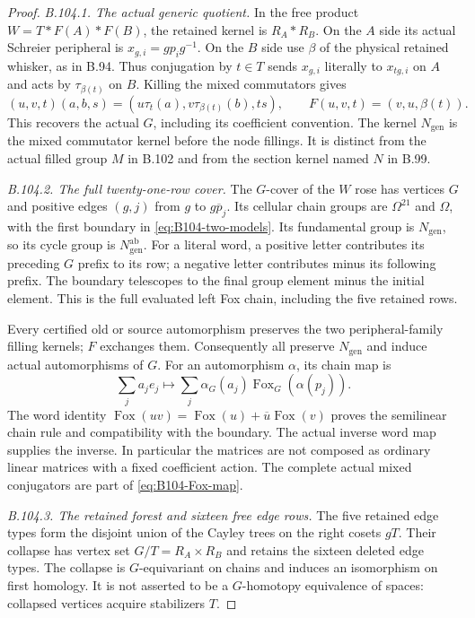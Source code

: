\begin{proof}
\emph{B.104.1. The actual generic quotient.}
In the free product $W=T*F(A)*F(B)$, the retained kernel is
$R_A*R_B$. On the $A$ side its actual Schreier peripheral is
$x_{g,i}=g p_i g^{-1}$. On the $B$ side use $\beta$ of the
physical retained whisker, as in B.94. Thus conjugation by $t\in T$
sends $x_{g,i}$ literally to $x_{tg,i}$ on $A$ and acts by
$\tau_{\beta(t)}$ on $B$. Killing the mixed commutators gives
\[
 (u,v,t)(a,b,s)=
       (u\tau_t(a),v\tau_{\beta(t)}(b),ts),
 \qquad F(u,v,t)=(v,u,\beta(t)).
\]
This recovers the actual $G$, including its coefficient convention.
The kernel $N_{\mathrm{gen}}$ is the mixed commutator kernel before
the node fillings. It is distinct from the actual filled group $M$
in B.102 and from the section kernel named $N$ in B.99.

\emph{B.104.2. The full twenty-one-row cover.}
The $G$-cover of the $W$ rose has vertices $G$ and positive edges
$(g,j)$ from $g$ to $g\overline p_j$. Its cellular chain groups are
$\Omega^{21}$ and $\Omega$, with the first boundary in
\eqref{eq:B104-two-models}. Its fundamental group is
$N_{\mathrm{gen}}$, so its cycle group is
$N_{\mathrm{gen}}^{\mathrm{ab}}$.
For a literal word, a positive letter contributes its preceding
$G$ prefix to its row; a negative letter contributes minus its
following prefix. The boundary telescopes to the final group
element minus the initial element. This is the full evaluated
left Fox chain, including the five retained rows.

Every certified old or source automorphism preserves the two
peripheral-family filling kernels; $F$ exchanges them. Consequently
all preserve $N_{\mathrm{gen}}$ and induce actual automorphisms of
$G$. For an automorphism $\alpha$, its chain map is
\begin{equation}\label{eq:B104-Fox-map}
 \sum_j a_j e_j\longmapsto
      \sum_j\alpha_G(a_j)\operatorname{Fox}_G(\alpha(p_j)).
\end{equation}
The word identity
$\operatorname{Fox}(uv)=\operatorname{Fox}(u)+\overline u\operatorname{Fox}(v)$
proves the semilinear chain rule and compatibility with the boundary.
The actual inverse word map supplies the inverse. In particular the
matrices are not composed as ordinary linear matrices with a fixed
coefficient action. The complete actual mixed conjugators are part
of \eqref{eq:B104-Fox-map}.

\emph{B.104.3. The retained forest and sixteen free edge rows.}
The five retained edge types form the disjoint union of the Cayley
trees on the right cosets $gT$. Their collapse has vertex set
$G/T=R_A\times R_B$ and retains the sixteen deleted edge types.
The collapse is $G$-equivariant on chains and induces an isomorphism
on first homology. It is not asserted to be a $G$-homotopy equivalence
of spaces: collapsed vertices acquire stabilizers $T$.


\end{proof}
